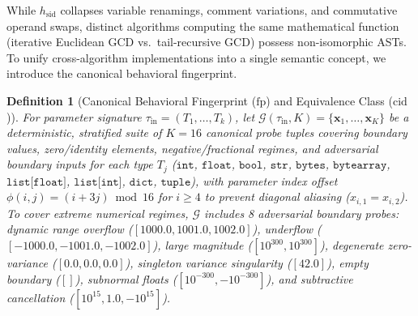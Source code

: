 \documentclass[10pt,twocolumn]{article}
\newtheorem{definition}{Definition}
\begin{document}
While $h_{\text{sid}}$ collapses variable renamings, comment variations, and commutative operand swaps, distinct algorithms computing the same mathematical function (iterative Euclidean GCD vs.\ tail-recursive GCD) possess non-isomorphic ASTs. To unify cross-algorithm implementations into a single semantic concept, we introduce the canonical behavioral fingerprint.

\begin{definition}[Canonical Behavioral Fingerprint ($\text{fp}$) and Equivalence Class ($\text{cid}$)]
\label{def:fp_cid}
For parameter signature $\tau_{\text{in}} = (T_1, \dots, T_k)$, let $\mathcal{G}(\tau_{\text{in}}, K) = \{\mathbf{x}_1, \dots, \mathbf{x}_K\}$ be a deterministic, stratified suite of $K=16$ canonical probe tuples covering boundary values, zero/identity elements, negative/fractional regimes, and adversarial boundary inputs for each type $T_j$ ($\texttt{int}$, $\texttt{float}$, $\texttt{bool}$, $\texttt{str}$, $\texttt{bytes}$, $\texttt{bytearray}$, $\texttt{list[float]}$, $\texttt{list[int]}$, $\texttt{dict}$, $\texttt{tuple}$), with parameter index offset $\phi(i, j) = (i + 3j) \bmod 16$ for $i \ge 4$ to prevent diagonal aliasing ($x_{i,1} = x_{i,2}$). To cover extreme numerical regimes, $\mathcal{G}$ includes 8 adversarial boundary probes: dynamic range overflow ($[1000.0, 1001.0, 1002.0]$), underflow ($[-1000.0, -1001.0, -1002.0]$), large magnitude ($[10^{300}, 10^{300}]$), degenerate zero-variance ($[0.0, 0.0, 0.0]$), singleton variance singularity ($[42.0]$), empty boundary ($[]$), subnormal floats ($[10^{-300}, -10^{-300}]$), and subtractive cancellation ($[10^{15}, 1.0, -10^{15}]$).


\end{definition}
\end{document}
